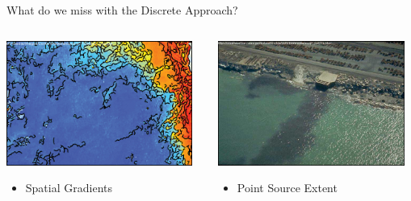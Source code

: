 \documentclass[compress,noflama,nosectionpages]{beamer}
\begin{document}
\begin{frame}{What do we miss with the Discrete Approach?}
\vspace{8pt}
	\begin{columns}
		\begin{column}[c]{6cm}
	  	\includegraphics[height=4.1cm,clip=true,trim = 0mm 0mm 0mm 0mm,keepaspectratio=true]{images/scipy_border.png}%
	  	\vspace{3pt}
	  	\begin{itemize}
	  		\item{Spatial Gradients}
	  	\end{itemize}
		\end{column}
		\begin{column}[c]{6cm}
			\includegraphics[height=4.1cm,keepaspectratio=true]{images/pointsource_border.png}%
			\vspace{3pt}
			\begin{itemize}
	  		\item{Point Source Extent}
	  	\end{itemize}
		\end{column}
	\end{columns}
     
\end{frame}
\end{document}
